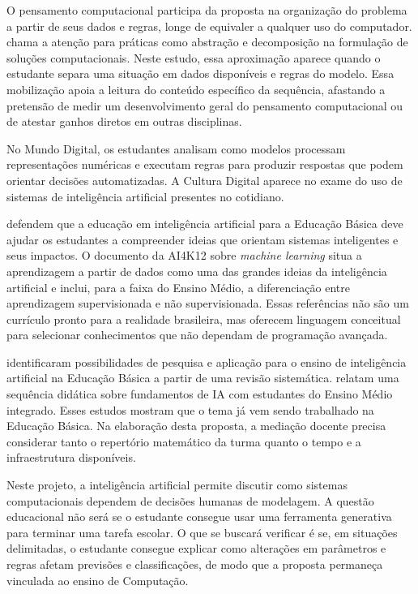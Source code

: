 O pensamento computacional participa da proposta na organização do problema a partir de seus dados e regras, longe de equivaler a qualquer uso do computador.  chama a atenção para práticas como abstração e decomposição na formulação de soluções computacionais. Neste estudo, essa aproximação aparece quando o estudante separa uma situação em dados disponíveis e regras do modelo. Essa mobilização apoia a leitura do conteúdo específico da sequência, afastando a pretensão de medir um desenvolvimento geral do pensamento computacional ou de atestar ganhos diretos em outras disciplinas.

No Mundo Digital, os estudantes analisam como modelos processam representações numéricas e executam regras para produzir respostas que podem orientar decisões automatizadas. A Cultura Digital aparece no exame do uso de sistemas de inteligência artificial presentes no cotidiano.

 defendem que a educação em inteligência artificial para a Educação Básica deve ajudar os estudantes a compreender ideias que orientam sistemas inteligentes e seus impactos. O documento da AI4K12 sobre \textit{machine learning} \cite{touretzky2023machine} situa a aprendizagem a partir de dados como uma das grandes ideias da inteligência artificial e inclui, para a faixa do Ensino Médio, a diferenciação entre aprendizagem supervisionada e não supervisionada. Essas referências não são um currículo pronto para a realidade brasileira, mas oferecem linguagem conceitual para selecionar conhecimentos que não dependam de programação avançada.

 identificaram possibilidades de pesquisa e aplicação para o ensino de inteligência artificial na Educação Básica a partir de uma revisão sistemática.  relatam uma sequência didática sobre fundamentos de IA com estudantes do Ensino Médio integrado. Esses estudos mostram que o tema já vem sendo trabalhado na Educação Básica. Na elaboração desta proposta, a mediação docente precisa considerar tanto o repertório matemático da turma quanto o tempo e a infraestrutura disponíveis.

Neste projeto, a inteligência artificial permite discutir como sistemas computacionais dependem de decisões humanas de modelagem. A questão educacional não será se o estudante consegue usar uma ferramenta generativa para terminar uma tarefa escolar. O que se buscará verificar é se, em situações delimitadas, o estudante consegue explicar como alterações em parâmetros e regras afetam previsões e classificações, de modo que a proposta permaneça vinculada ao ensino de Computação.

